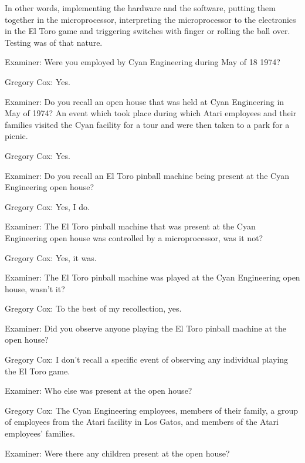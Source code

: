 In other words, implementing the hardware and the software, putting them together in the microprocessor, interpreting the microprocessor to the electronics in the El Toro game and triggering switches with finger or rolling the ball over. Testing was of that nature. 





\textcolor{interviewer}{Examiner:} Were you employed by Cyan Engineering during May of 18 1974? 

\textcolor{interviewee}{Gregory Cox:} Yes. 

\textcolor{interviewer}{Examiner:} Do you recall an open house that was held at Cyan Engineering in May of 1974? An event which took place during which Atari employees and their families visited the Cyan facility for a tour and were then taken to a park for a picnic.

\textcolor{interviewee}{Gregory Cox:} Yes. 

\textcolor{interviewer}{Examiner:} Do you recall an El Toro pinball machine being present at the Cyan Engineering open house? 

\textcolor{interviewee}{Gregory Cox:} Yes, I do.

\textcolor{interviewer}{Examiner:} The El Toro pinball machine that was present at the Cyan Engineering open house was controlled by a microprocessor, was it not? 

\textcolor{interviewee}{Gregory Cox:} Yes, it was. 

\textcolor{interviewer}{Examiner:} The El Toro pinball machine was played at the Cyan Engineering open house, wasn't it?

\textcolor{interviewee}{Gregory Cox:} To the best of my recollection, yes.

\textcolor{interviewer}{Examiner:} Did you observe anyone playing the El Toro pinball machine at the open house? 

\textcolor{interviewee}{Gregory Cox:} I don’t recall a specific event of observing any individual playing the El Toro game. 

\textcolor{interviewer}{Examiner:} Who else was present at the open house? 

\textcolor{interviewee}{Gregory Cox:} The Cyan Engineering employees, members of their family, a group of employees from the Atari facility in Los Gatos, and members of the Atari employees' families. 

\textcolor{interviewer}{Examiner:} Were there any children present at the open house? 

